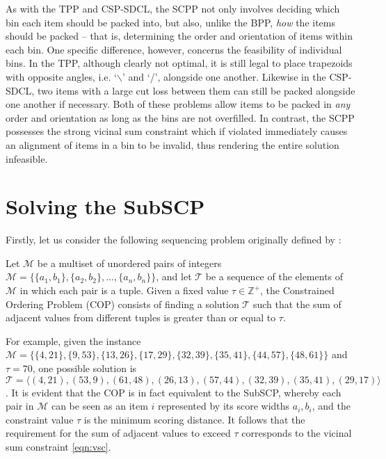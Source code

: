 \documentclass[authoryear]{elsarticle}
\begin{document}
As with the TPP and CSP-SDCL, the SCPP not only involves deciding which bin each item should be packed into, but also, unlike the BPP, \emph{how} the items should be packed -- that is, determining the order and orientation of items within each bin. One specific difference, however, concerns the feasibility of individual bins. In the TPP, although clearly not optimal, it is still legal to place trapezoids with opposite angles, i.e. `$\backslash$' and `/', alongside one another. Likewise in the CSP-SDCL, two items with a large cut loss between them can still be packed alongside one another if necessary. Both of these problems allow items to be packed in \emph{any} order and orientation as long as the bins are not overfilled. In contrast, the SCPP possesses the strong vicinal sum constraint which if violated immediately causes an alignment of items in a bin to be invalid, thus rendering the entire solution infeasible.

\section{Solving the SubSCP}
\label{sec:ahc}
\noindent Firstly, let us consider the following sequencing problem originally defined by \citet{hawa2018}:

\begin{definition} %
	\label{defn:cop}
	Let $\mathcal{M}$ be a multiset of unordered pairs of integers $\mathcal{M} = \{\{a_1, b_1\}, \{a_2, b_2\},\dotsc,\{a_n, b_n\}\}$, and let $\mathcal{T}$ be a sequence of the elements of $\mathcal{M}$ in which each pair is a tuple. Given a fixed value $\tau \in \mathbb{Z}^+$, the Constrained Ordering Problem (COP) consists of finding a solution $\mathcal{T}$ such that the sum of adjacent values from different tuples is greater than or equal to $\tau$.
\end{definition}

\noindent For example, given the instance $\mathcal{M} = \{\{4,21\}, \{9,53\}, \{13,26\}, \{17,29\}, \{32,39\}, \{35,41\}, \{44,57\}, \{48,61\} \}$ and $\tau = 70$, one possible solution is $\mathcal{T} = \langle(4,21), (53,9), (61,48), (26,13), (57,44), (32,39), (35,41), (29,17)\rangle$. It is evident that the COP is in fact equivalent to the SubSCP, whereby each pair in $\mathcal{M}$ can be seen as an item $i$ represented by its score widths $a_i, b_i$, and the constraint value $\tau$ is the minimum scoring distance. It follows that the requirement for the sum of adjacent values to exceed $\tau$ corresponds to the vicinal sum constraint \eqref{eqn:vsc}.
\end{document}
